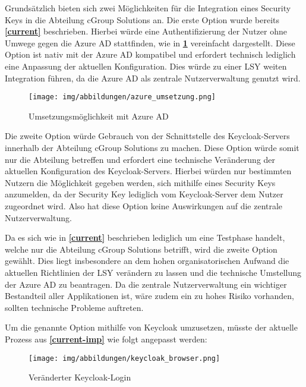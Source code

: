Grundsätzlich bieten sich zwei Möglichkeiten für die Integration eines Security Keys in die Abteilung cGroup Solutions an. Die erste Option wurde bereits \textbf{\ref{current}} beschrieben. Hierbei würde eine Authentifizierung der Nutzer ohne Umwege gegen die Azure \ac{AD} stattfinden, wie in \textbf{\ref{azure-imp}} vereinfacht dargestellt. Diese Option ist nativ mit der Azure \ac{AD} kompatibel und erfordert technisch lediglich eine Anpassung der aktuellen Konfiguration. Dies würde zu einer \ac{LSY} weiten Integration führen, da die Azure \ac{AD} als zentrale Nutzerverwaltung genutzt wird.

\begin{figure}[h]
	\centering 
	\texttt{[image: img/abbildungen/azure\_umsetzung.png]}
	\captionsetup{format=hang}
	\caption{Umsetzungsmöglichkeit mit Azure \ac{AD}} \label{azure-imp}
\end{figure}

Die zweite Option würde Gebrauch von der Schnittstelle des Keycloak-Servers innerhalb der Abteilung cGroup Solutions zu machen. Diese Option würde somit nur die Abteilung betreffen und erfordert eine technische Veränderung der aktuellen Konfiguration des Keycloak-Servers. Hierbei würden nur bestimmten Nutzern die Möglichkeit gegeben werden, sich mithilfe eines Security Keys anzumelden, da der Security Key lediglich vom Keycloak-Server dem Nutzer zugeordnet wird. Also hat diese Option keine Auswirkungen auf die zentrale Nutzerverwaltung. 

Da es sich wie in \textbf{\ref{current}} beschrieben lediglich um eine Testphase handelt, welche nur die Abteilung cGroup Solutions betrifft, wird die zweite Option gewählt. Dies liegt insbesondere an dem hohen organisatorischen Aufwand die aktuellen Richtlinien der \ac{LSY} verändern zu lassen und die technische Umstellung der Azure \ac{AD} zu beantragen. Da die zentrale Nutzerverwaltung ein wichtiger Bestandteil aller Applikationen ist, wäre zudem ein zu hohes Risiko vorhanden, sollten technische Probleme auftreten. 

Um die genannte Option mithilfe von Keycloak umzusetzen, müsste der aktuelle Prozess aus \textbf{\ref{current-imp}} wie folgt angepasst werden:

\begin{figure}[H]
	\centering 
	\texttt{[image: img/abbildungen/keycloak\_browser.png]}
	\captionsetup{format=hang}
	\caption{Veränderter Keycloak-Login}
\end{figure}

